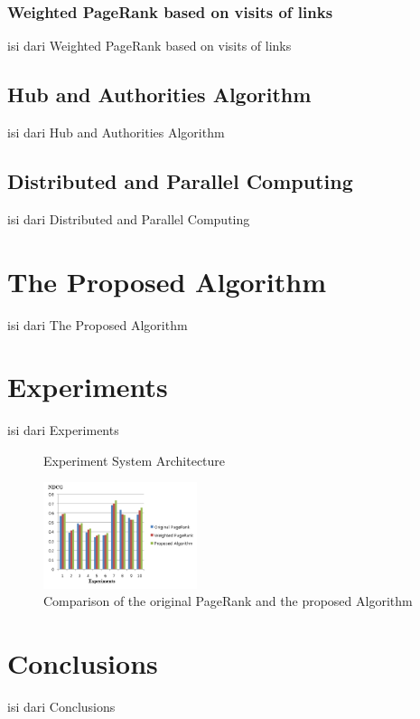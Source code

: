 \documentclass[conference]{IEEEtran}
\begin{document}
\subsubsection{Weighted PageRank based on visits of links}
isi dari Weighted PageRank based on visits of links

\subsection{Hub and Authorities Algorithm}
isi dari Hub and Authorities Algorithm

\subsection{Distributed and Parallel Computing}
isi dari Distributed and Parallel Computing

\section{The Proposed Algorithm}
isi dari The Proposed Algorithm

\section{Experiments}
isi dari Experiments

\begin{figure}
    \centering
    \def\svgwidth{\columnwidth}
    \scalebox{0.6}{}
    \caption{Experiment System Architecture}
\end{figure}

\begin{figure}
    \centering
    \includegraphics[width=0.4\textwidth]{gambar2.png}
    \caption{Comparison of the original PageRank and the proposed Algorithm}
\end{figure}

\section{Conclusions}
isi dari Conclusions



\end{document}
